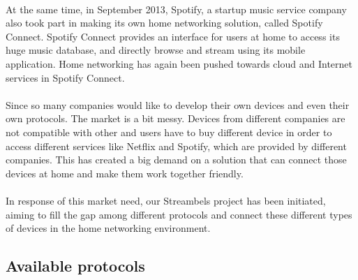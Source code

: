 \\
At the same time, in September 2013, Spotify, a startup music service 
company also took part in making its own home networking solution, called 
Spotify Connect. Spotify Connect provides an interface for users at home to access its huge 
music database, and directly browse and stream using its mobile application. Home 
networking has again been pushed towards cloud and Internet services in Spotify Connect. \\
\\
Since so many companies would like to develop their own devices and even their 
own protocols. The market is a bit messy. Devices from different companies are not compatible with other and users have to buy different device in order to access different services like Netflix and Spotify, which are provided by different companies.  This has created a big demand on a solution that can connect those devices at home and make them work together friendly. \\
\\
In response of this market need, our Streambels project has been initiated, aiming to fill the gap among different protocols and connect these different types of devices in the home networking environment.
\subsection{Available protocols} 
